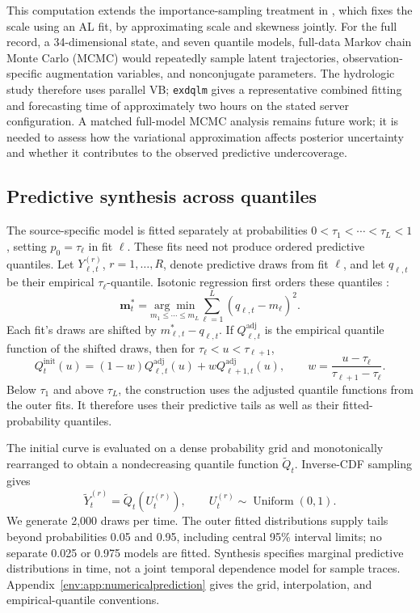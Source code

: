 This computation extends the importance-sampling treatment in \citet{exd-me},
which fixes the scale using an AL fit, by approximating scale and skewness
jointly. For the full record, a 34-dimensional state, and seven quantile
models, full-data Markov chain Monte Carlo (MCMC) would repeatedly sample
latent trajectories, observation-specific augmentation variables, and
nonconjugate parameters. The hydrologic study therefore uses parallel VB;
\texttt{exdqlm} gives a representative
combined fitting and forecasting time of approximately two hours on the stated
server configuration. A matched full-model MCMC analysis remains future work;
it is needed to assess how the variational approximation affects posterior
uncertainty and whether it contributes to the observed predictive
undercoverage.

\subsection{Predictive synthesis across quantiles}
\label{env:subsec:quantilesynthesis}

The source-specific model is fitted separately at probabilities
$0<\tau_1<\cdots<\tau_L<1$, setting $p_0=\tau_\ell$ in fit $\ell$. These
fits need not produce ordered predictive quantiles. Let
$Y_{\ell,t}^{(r)}$, $r=1,\ldots,R$, denote predictive draws from fit $\ell$,
and let $q_{\ell,t}$ be their empirical $\tau_\ell$-quantile. Isotonic
regression first orders these quantiles \citep{exd-barlow1972}:
\[
\mathbf m_t^*=\underset{m_1\le\cdots\le m_L}{\arg\min}
\sum_{\ell=1}^L(q_{\ell,t}-m_\ell)^2.
\]
Each fit's draws are shifted by $m_{\ell,t}^*-q_{\ell,t}$. If
$Q^{\mathrm{adj}}_{\ell,t}$ is the empirical quantile function of the
shifted draws, then for $\tau_\ell<u<\tau_{\ell+1}$,
\[
Q_t^{\mathrm{init}}(u)=(1-w)Q^{\mathrm{adj}}_{\ell,t}(u)
+wQ^{\mathrm{adj}}_{\ell+1,t}(u),\qquad
w=\frac{u-\tau_\ell}{\tau_{\ell+1}-\tau_\ell}.
\]
Below $\tau_1$ and above $\tau_L$, the construction uses the adjusted
quantile functions from the outer fits. It therefore uses their predictive
tails as well as their fitted-probability quantiles.

The initial curve is evaluated on a dense probability grid and monotonically
rearranged \citep{exd-chernozhukov2010} to obtain a nondecreasing quantile
function $\widetilde Q_t$. Inverse-CDF sampling gives
\[
\widetilde Y_t^{(r)}=\widetilde Q_t(U_t^{(r)}),\qquad
U_t^{(r)}\sim\operatorname{Uniform}(0,1).
\]
We generate 2,000 draws per time. The outer fitted distributions supply tails
beyond probabilities 0.05 and 0.95, including central 95\% interval limits;
no separate 0.025 or 0.975 models are fitted. Synthesis specifies marginal
predictive distributions in time, not a joint temporal dependence model for
sample traces. Appendix~\ref{env:app:numericalprediction} gives the grid,
interpolation, and empirical-quantile conventions.

